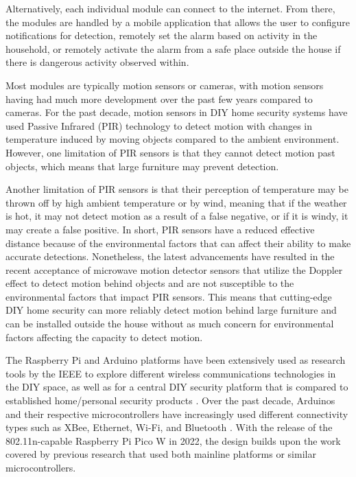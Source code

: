 Alternatively, each individual module can connect to the internet. \cite{sarhan2020} From
there, the modules are handled by a mobile application that allows the user to configure
notifications for detection, remotely set the alarm based on activity in the household, or
remotely activate the alarm from a safe place outside the house if there is dangerous
activity observed within. \cite{joseMalekian2017}

Most modules are typically motion sensors or cameras, with motion sensors having had
much more development over the past few years compared to cameras. For the past decade,
motion sensors in DIY home security systems have used Passive Infrared (PIR) technology to
detect motion with changes in temperature induced by moving objects compared to the ambient
environment. \cite{sarhan2020} However, one limitation of PIR sensors is that they cannot
detect motion past objects, which means that large furniture may prevent detection.

Another limitation of PIR sensors is that their perception of temperature may be thrown off
by high ambient temperature or by wind, meaning that if the weather is hot, it may not detect
motion as a result of a false negative, or if it is windy, it may create a false
positive.\cite{rhizmaSuhendar2022} \cite{TaiwoEtAl2022} In short, PIR sensors have a reduced
effective distance because of the environmental factors that can affect their ability to make
accurate detections. Nonetheless, the latest advancements have resulted in the recent
acceptance of microwave motion detector sensors that utilize the Doppler effect to detect
motion behind objects and are not susceptible to the environmental factors that impact PIR
sensors. \cite{sarhan2020} This means that cutting-edge DIY home security can more reliably
detect motion behind large furniture and can be installed outside the house without as much
concern for environmental factors affecting the capacity to detect motion.

The Raspberry Pi and Arduino platforms have been extensively used as research tools by the
IEEE to explore different wireless communications technologies in the DIY space, as well as
for a central DIY security platform that is compared to established home/personal security
products \cite{sarhan2020}. Over the past decade, Arduinos and their respective
microcontrollers have increasingly used different connectivity types such as XBee, Ethernet,
Wi-Fi, and Bluetooth \cite{sarhan2020} \cite{HameedEtAl2022}. With the release of the
802.11n-capable Raspberry Pi Pico W in 2022, the \brand{} design builds upon the work covered 
by previous research that used both mainline platforms or similar microcontrollers.